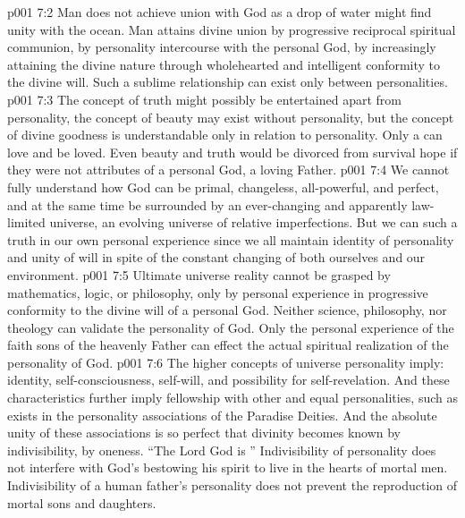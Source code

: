 \vs p001 7:2 Man does not achieve union with God as a drop of water might find unity with the ocean. Man attains divine union by progressive reciprocal spiritual communion, by personality intercourse with the personal God, by increasingly attaining the divine nature through wholehearted and intelligent conformity to the divine will. Such a sublime relationship can exist only between personalities.
\vs p001 7:3 \pc The concept of truth might possibly be entertained apart from personality, the concept of beauty may exist without personality, but the concept of divine goodness is understandable only in relation to personality. Only a  can love and be loved. Even beauty and truth would be divorced from survival hope if they were not attributes of a personal God, a loving Father.
\vs p001 7:4 \pc We cannot fully understand how God can be primal, changeless, all\hyp{}powerful, and perfect, and at the same time be surrounded by an ever\hyp{}changing and apparently law\hyp{}limited universe, an evolving universe of relative imperfections. But we can  such a truth in our own personal experience since we all maintain identity of personality and unity of will in spite of the constant changing of both ourselves and our environment.
\vs p001 7:5 Ultimate universe reality cannot be grasped by mathematics, logic, or philosophy, only by personal experience in progressive conformity to the divine will of a personal God. Neither science, philosophy, nor theology can validate the personality of God. Only the personal experience of the faith sons of the heavenly Father can effect the actual spiritual realization of the personality of God.
\vs p001 7:6 \pc The higher concepts of universe personality imply: identity, self\hyp{}consciousness, self\hyp{}will, and possibility for self\hyp{}revelation. And these characteristics further imply fellowship with other and equal personalities, such as exists in the personality associations of the Paradise Deities. And the absolute unity of these associations is so perfect that divinity becomes known by indivisibility, by oneness. “The Lord God is ” Indivisibility of personality does not interfere with God’s bestowing his spirit to live in the hearts of mortal men. Indivisibility of a human father’s personality does not prevent the reproduction of mortal sons and daughters.
